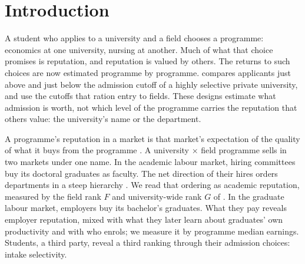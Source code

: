 \begin{abstract}
When students choose a university and a field, which reputation do they buy? A university $\times$ field programme
is valued in two markets; we read its academic reputation from faculty hiring and its employer reputation from
graduates' pay. Using public data on 52 US fields and 33 UK subjects, we ask where the two rankings agree. Within
fields they agree, but the agreement sits at the university level. Most of it is shared with intake selectivity:
controls for selectivity and institutional traits lower mean US agreement from $+0.43$ to $+0.14$. Within a
university, one standard deviation of a department's field rank goes with about 0.8\% higher pay, an interval
reaching zero; only computer science is clear on its own. Agreement rises with years since graduation and is weak
where pay follows national scales. The design is descriptive; for students, the reputation both markets recognise is
mostly the university's.
\end{abstract}

\section{Introduction}\label{sec:intro}

A student who applies to a university and a field chooses a programme: economics at one university, nursing at
another. Much of what that choice promises is reputation, and reputation is valued by others. The returns to such
choices are now estimated programme by programme. \citet{anelli2020returns} compares applicants just above and just
below the admission cutoff of a highly selective private university, and \citet{kirkeboen2016field} use the cutoffs
that ration entry to fields. These designs estimate what admission is worth, not which level of the programme
carries the reputation that others value: the university's name or the department.

A programme's reputation in a market is that market's expectation of the quality of what it buys from the programme
\citep{tadelis1999name, macleod2015reputation}. A university $\times$ field programme sells in two markets under one
name. In the academic labour market, hiring committees buy its doctoral graduates as faculty. The net direction of
their hires orders departments in a steep hierarchy \citep{clauset2015systematic}. We read that ordering as academic
reputation, measured by the field rank $F$ and university-wide rank $G$ of \citet{wapman2022quantifying}. In the
graduate labour market, employers buy its bachelor's graduates. What they pay reveals employer reputation, mixed
with what they later learn about graduates' own productivity and with who enrols; we measure it by programme median
earnings. Students, a third party, reveal a third ranking through their admission choices: intake selectivity.

